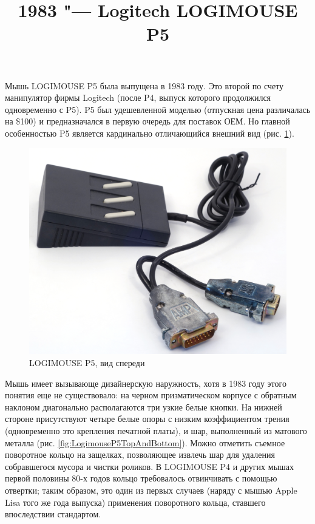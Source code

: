 \documentclass[11pt, a4paper]{article}
\begin{document}
\title{1983 "--- Logitech LOGIMOUSE P5}
\date{}
\maketitle

Мышь LOGIMOUSE P5 была выпущена в 1983 году. Это второй по счету манипулятор фирмы Logitech (после P4, выпуск которого продолжился одновременно с P5). P5 был удешевленной моделью (отпускная цена различалась на \$100) и предназначался в первую очередь для поставок ОЕМ.
Но главной особенностью P5 является кардинально отличающийся внешний вид (рис. \ref{fig:LogimouseP5Pic}). 

\begin{figure}[h]
   \centering
    \includegraphics[scale=0.35]{1983_logitech_logimouse_p5/pic_30.jpg}
    \caption{LOGIMOUSE P5, вид спереди}
    \label{fig:LogimouseP5Pic}
\end{figure}

Мышь имеет вызывающе дизайнерскую наружность, хотя в 1983 году этого понятия еще не существовало: на черном призматическом корпусе с обратным наклоном диагонально располагаются три узкие белые кнопки. На нижней стороне присутствуют четыре белые опоры с низким коэффициентом трения (одновременно это крепления печатной платы), и шар, выполненный из матового металла (рис. \ref{fig:LogimouseP5TopAndBottom}). Можно отметить съемное поворотное кольцо на защелках, позволяющее извлечь шар для удаления собравшегося мусора и чистки роликов. В LOGIMOUSE P4 и других мышах первой половины 80-х годов кольцо требовалось отвинчивать с помощью отвертки; таким образом, это один из первых случаев (наряду с мышью Apple Lisa того же года выпуска) применения поворотного кольца, ставшего впоследствии стандартом.
\end{document}
